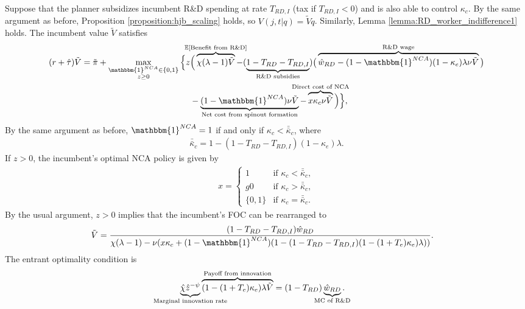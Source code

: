 \documentclass[11pt,english]{article}
\theoremstyle{definition}
\begin{document}
Suppose that the planner subsidizes incumbent R\&D spending at rate $T_{RD,I}$ (tax if $T_{RD,I} < 0$) and is also able to control $\kappa_c$. By the same argument as before, Proposition \ref{proposition:hjb_scaling} holds, so $V(j,t|q) = \tilde{V}q$. Similarly, Lemma \ref{lemma:RD_worker_indifference1} holds. The incumbent value $\tilde{V}$ satisfies
\begin{align}
	(r + \hat{\tau}) \tilde{V} = \tilde{\pi} + \max_{\substack{\mathbbm{1}^{NCA} \in \{0,1\} \\ z \ge 0}} \Big\{z &\Big( \overbrace{\chi (\lambda - 1) \tilde{V}}^{\mathclap{\mathbb{E}[\textrm{Benefit from R\&D}]}}-  (\underbrace{1 - T_{RD} - T_{RD,I}}_{\mathclap{\text{R\&D subsidies}}})\big( \overbrace{\hat{w}_{RD} - (1-\mathbbm{1}^{NCA})(1-\kappa_e)\lambda \nu \tilde{V}}^{\mathclap{\text{R\&D wage}}}\big) \label{eq:hjb_incumbent_all} \nonumber \\ 
	&-  \underbrace{(1-\mathbbm{1}^{NCA}) \nu \tilde{V}}_{\mathclap{\text{Net cost from spinout formation}}} - \overbrace{x \kappa_{c} \nu \tilde{V}}^{\mathclap{\text{Direct cost of NCA}}}\Big) \Big\},
\end{align}
By the same argument as before, $\mathbbm{1}^{NCA} = 1$ if and only if $\kappa_c < \bar{\bar{\kappa}}_c$, where
\begin{align}
	\bar{\bar{\kappa}}_c = 1 - (1-T_{RD} - T_{RD,I})(1-\kappa_e)\lambda. \label{eq:barkappa_all}
\end{align} 
If $z > 0$, the incumbent's optimal NCA policy is given by 
\begin{align}
	x = \begin{cases}
		1 & \textrm{if } \kappa_c < \bar{\bar{\kappa}}_c, \\g
		0 & \textrm{if } \kappa_c > \bar{\bar{\kappa}}_c, \\
		\{0,1\} & \textrm{if } \kappa_c = \bar{\bar{\kappa}}_c.
	\end{cases} \label{eq:nca_policy_all}
\end{align}
By the usual argument, $z > 0$ implies that the incumbent's FOC can be rearranged to
\begin{align}
	\tilde{V} &= \frac{(1-T_{RD} - T_{RD,I})\hat{w}_{RD}}{\chi(\lambda -1) - \nu (x\kappa_c + (1-\mathbbm{1}^{NCA})(1 - (1-T_{RD} - T_{RD,I})(1-(1+T_e)\kappa_e)\lambda)) }. \label{eq:hjb_incumbent_foc_all}
\end{align}
The entrant optimality condition is
\begin{align}
	\underbrace{\hat{\chi} \hat{z}^{-\psi}}_{\mathclap{\text{Marginal innovation rate}}} \overbrace{(1-(1+T_e)\kappa_e) \lambda \tilde{V}}^{\mathclap{\text{Payoff from innovation}}} &= (1-T_{RD})\underbrace{\hat{w}_{RD}}_{\mathclap{\text{MC of R\&D}}}. \label{eq:free_entry_condition_all}
\end{align}
\end{document}
